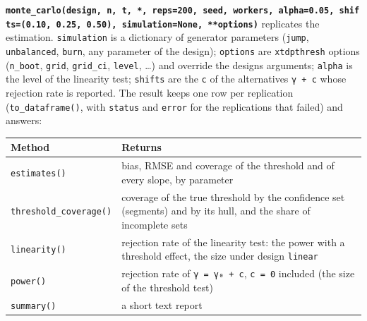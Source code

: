 \documentclass[
  10.5pt,
  a4paper,
]{article}
\newcounter{none} %
\begin{document}
\textbf{\texttt{monte\_carlo(design,\ n,\ t,\ *,\ reps=200,\ seed,\ workers,\ alpha=0.05,\ shifts=(0.10,\ 0.25,\ 0.50),\ simulation=None,\ **options)}}
replicates the estimation. \texttt{simulation} is a dictionary of
generator parameters (\texttt{jump}, \texttt{unbalanced}, \texttt{burn},
any parameter of the design); \texttt{options} are \texttt{xtdpthresh}
options (\texttt{n\_boot}, \texttt{grid}, \texttt{grid\_ci},
\texttt{level}, \ldots) and override the design\textquotesingle s
arguments; \texttt{alpha} is the level of the linearity test;
\texttt{shifts} are the \texttt{c} of the alternatives \texttt{γ\ +\ c}
whose rejection rate is reported. The result keeps one row per
replication (\texttt{to\_dataframe()}, with \texttt{status} and
\texttt{error} for the replications that failed) and answers:

{\def\LTcaptype{none} %
\begin{longtable}[]{@{}
  >{\raggedright\arraybackslash}p{}
  >{\raggedright\arraybackslash}p{}@{}}
\toprule\noalign{}
\begin{minipage}[b]{\linewidth}\raggedright
Method
\end{minipage} & \begin{minipage}[b]{\linewidth}\raggedright
Returns
\end{minipage} \\
\midrule\noalign{}
\endhead
\bottomrule\noalign{}
\endlastfoot
\texttt{estimates()} & bias, RMSE and coverage of the threshold and of
every slope, by parameter \\
\texttt{threshold\_coverage()} & coverage of the true threshold by the
confidence set (segments) and by its hull, and the share of incomplete
sets \\
\texttt{linearity()} & rejection rate of the linearity test: the power
with a threshold effect, the size under design \texttt{linear} \\
\texttt{power()} & rejection rate of \texttt{γ\ =\ γ₀\ +\ c},
\texttt{c\ =\ 0} included (the size of the threshold test) \\
\texttt{summary()} & a short text report \\
\end{longtable}
}
\end{document}
